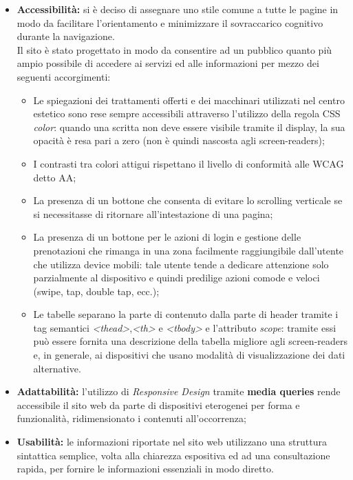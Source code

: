 \documentclass[]{article}
\begin{document}
	\begin{itemize}
		\item \textbf{Accessibilità:} si è deciso di assegnare uno stile comune a tutte le pagine in modo da facilitare l'orientamento e minimizzare il sovraccarico cognitivo durante la navigazione. \\
			Il sito è stato progettato in modo da consentire ad un pubblico quanto più ampio possibile di accedere ai servizi ed alle informazioni per mezzo dei seguenti accorgimenti:
			\begin{itemize}
				\item Le spiegazioni dei trattamenti offerti e dei macchinari utilizzati nel centro estetico sono rese sempre accessibili attraverso l'utilizzo della regola CSS \textit{color}: quando una scritta non deve essere visibile tramite il display, la sua opacità è resa pari a zero (non è quindi nascosta agli screen-readers);
				\item I contrasti tra colori attigui rispettano il livello di conformità alle WCAG detto AA;
				\item La presenza di un bottone che consenta di evitare lo scrolling verticale se si necessitasse di ritornare all'intestazione di una pagina; 
				\item La presenza di un bottone per le azioni di login e gestione delle prenotazioni che rimanga in una zona facilmente raggiungibile dall'utente che utilizza device mobili: tale utente tende a dedicare attenzione solo parzialmente al dispositivo e quindi predilige azioni comode e veloci (swipe, tap, double tap, ecc.); 						
				\item Le tabelle separano la parte di contenuto dalla parte di header tramite i tag semantici \textit{<thead>},\textit{<th>} e \textit{<tbody>} e l'attributo \textit{scope}: tramite essi può essere fornita una descrizione della tabella migliore agli screen-readers e, in generale, ai dispositivi che usano modalità di visualizzazione dei dati alternative.
			\end{itemize}
			\item \textbf{Adattabilità:} l'utilizzo di \textit{Responsive Design} tramite \textbf{media queries} rende accessibile il sito web da parte di dispositivi eterogenei per forma e funzionalità, ridimensionato i contenuti all'occorrenza;
			\item \textbf{Usabilità:} le informazioni riportate nel sito web utilizzano una struttura sintattica semplice, volta alla chiarezza espositiva ed ad una consultazione rapida, per fornire le informazioni essenziali in modo diretto.		
	\end{itemize}
\end{document}
